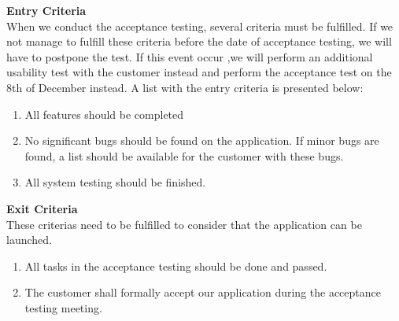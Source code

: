 \noindent \textbf{Entry Criteria}\\
When we conduct the acceptance testing, several criteria must be fulfilled. If we not manage to fulfill these criteria before the date of acceptance testing, we will have to postpone the test. If this event occur ,we will perform an additional usability test with the customer instead and perform the acceptance test on the 8th of December instead. A list with the entry criteria is presented below:
\begin{enumerate}
    \item All features should be completed
    \item No significant bugs should be found on the application. If minor bugs are found, a list should be available for the customer with these bugs.
    \item All system testing should be finished.
\end{enumerate}

\noindent \textbf{Exit Criteria}\\
These criterias need to be fulfilled to consider that the application can be launched.
\begin{enumerate}
    \item All tasks in the acceptance testing should be done and passed.
    \item The customer shall formally accept our application during the acceptance testing meeting.
\end{enumerate}

